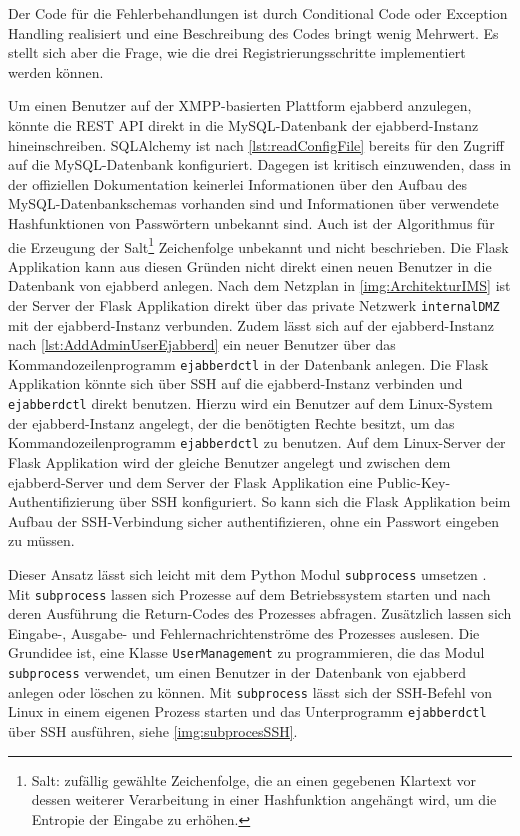 \documentclass[a4paper,titlepage,halfparskip,12pt]{scrreprt}
\begin{document}
\begin{onehalfspacing}
Der Code für die Fehlerbehandlungen ist durch Conditional Code oder Exception Handling realisiert und eine Beschreibung des Codes bringt wenig Mehrwert. Es stellt sich aber die Frage, wie die drei Registrierungsschritte implementiert werden können.

Um einen Benutzer auf der \acs{XMPP}-basierten Plattform ejabberd anzulegen, könnte die \acs{REST} \acs{API} direkt in die MySQL-Datenbank der ejabberd-Instanz hineinschreiben. SQLAlchemy ist nach \autoref{lst:readConfigFile} bereits für den Zugriff auf die MySQL-Datenbank konfiguriert. Dagegen ist kritisch einzuwenden, dass in der offiziellen Dokumentation \cite{ejabberdDoc} keinerlei Informationen über den Aufbau des MySQL-Datenbankschemas vorhanden sind und Informationen über verwendete Hashfunktionen von Passwörtern unbekannt sind. Auch ist der Algorithmus für die Erzeugung der Salt\footnote{Salt: zufällig gewählte Zeichenfolge, die an einen gegebenen Klartext vor dessen weiterer Verarbeitung in einer Hashfunktion angehängt wird, um die Entropie der Eingabe zu erhöhen.\cite{wendzel2018}} Zeichenfolge unbekannt und nicht beschrieben. Die Flask Applikation kann aus diesen Gründen nicht direkt einen neuen Benutzer in die Datenbank von ejabberd anlegen. Nach dem Netzplan in \autoref{img:ArchitekturIMS} ist der Server der Flask Applikation direkt über das private Netzwerk \texttt{internalDMZ} mit der ejabberd-Instanz verbunden. Zudem lässt sich auf der ejabberd-Instanz nach \autoref{lst:AddAdminUserEjabberd} ein neuer Benutzer über das Kommandozeilenprogramm \texttt{ejabberdctl} in der Datenbank anlegen. Die Flask Applikation könnte sich über \ac{SSH} auf die ejabberd-Instanz verbinden und \texttt{ejabberdctl} direkt benutzen. Hierzu wird ein Benutzer auf dem Linux-System der ejabberd-Instanz angelegt, der die benötigten Rechte besitzt, um das Kommandozeilenprogramm \texttt{ejabberdctl} zu benutzen. Auf dem Linux-Server der Flask Applikation wird der gleiche Benutzer angelegt und zwischen dem ejabberd-Server und dem Server der Flask Applikation eine Public-Key-Authentifizierung über \ac{SSH} konfiguriert. So kann sich die Flask Applikation beim Aufbau der \ac{SSH}-Verbindung sicher authentifizieren, ohne ein Passwort eingeben zu müssen.

Dieser Ansatz lässt sich leicht mit dem Python Modul \texttt{subprocess} umsetzen \cite{pythonSubprocess}. Mit \texttt{subprocess} lassen sich Prozesse auf dem Betriebssystem starten und nach deren Ausführung die Return-Codes des Prozesses abfragen. Zusätzlich lassen sich Eingabe-, Ausgabe- und Fehlernachrichtenströme des Prozesses auslesen. Die Grundidee ist, eine Klasse \texttt{UserManagement} zu programmieren, die das Modul \texttt{subprocess} verwendet, um einen Benutzer in der Datenbank von ejabberd anlegen oder löschen zu können. Mit \texttt{subprocess} lässt sich der \ac{SSH}-Befehl von Linux in einem eigenen Prozess starten und das Unterprogramm \texttt{ejabberdctl} über \ac{SSH} ausführen, siehe \autoref{img:subprocesSSH}.


\end{onehalfspacing}
\end{document}
